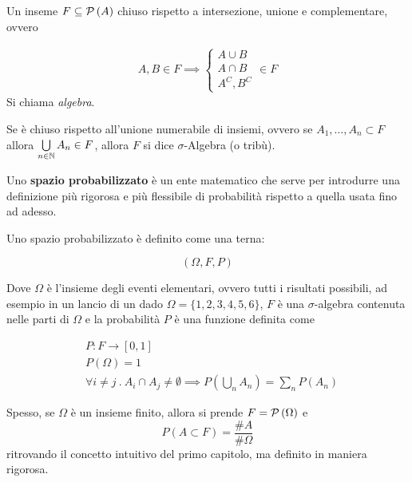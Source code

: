 \begin{defn}
	Un inseme $ F \subseteq \mathcal{P}\left(A\right) $ chiuso rispetto a intersezione, unione e complementare, ovvero

	\begin{equation*}
	\begin{aligned}
		A,B \in F \implies \begin{cases}
			A \cup B \\
			A \cap B \\
			A^C, B^C
		\end{cases} \in F
	\end{aligned}
	\end{equation*}
	Si chiama {\em algebra}.

	Se \`e chiuso rispetto all'unione numerabile di insiemi, ovvero se $ A_1, \dots, A_n \subset F $ allora $ \bigcup\limits_{n \in \mathbb{N}} A_n \in F $, allora $ F $  si dice  $ \sigma $-Algebra (o trib\`u).
\end{defn}
Uno \textbf{spazio probabilizzato} \`e un ente matematico che serve per introdurre una definizione pi\`u rigorosa e pi\`u flessibile di probabilit\`a rispetto a quella usata fino ad adesso.
\begin{defn}
	 Uno spazio probabilizzato \`e definito come una terna:

	\begin{equation}
		(\Omega, F, P)
	\end{equation}

	Dove $ \Omega $ \`e l'insieme degli eventi elementari, ovvero tutti i risultati possibili, ad esempio in un lancio di un dado $ \Omega = \{1,2,3,4,5,6\} $, $F$ \`e una $\sigma$-algebra contenuta nelle parti di $\Omega$ e 
	la probabilit\`a $ P $ \`e una funzione definita come

	\begin{eqnarray}
			&P : F \to [0,1] \nonumber\\
			&P(\Omega) = 1 \\
			&\forall i \neq j \> . \> A_i \cap A_j \neq \emptyset \implies P \left( \bigcup\limits_{n} A_n \right) = \sum_{n} P(A_n)\nonumber
	\end{eqnarray}
\end{defn}

Spesso, se $ \Omega $ \`e un insieme finito, allora si prende $ F = \mathcal{P}\left(\Omega\right) $ e
	\begin{equation*}
		P (A \subset F) = \dfrac{\#A}{\#\Omega}
	\end{equation*}
	ritrovando il concetto intuitivo del primo capitolo, ma definito in maniera rigorosa.


